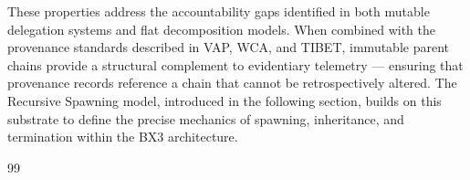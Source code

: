 These properties address the accountability gaps identified in both mutable delegation systems and flat decomposition models. When combined with the provenance standards described in VAP, WCA, and TIBET, immutable parent chains provide a structural complement to evidentiary telemetry — ensuring that provenance records reference a chain that cannot be retrospectively altered. The Recursive Spawning model, introduced in the following section, builds on this substrate to define the precise mechanics of spawning, inheritance, and termination within the BX3 architecture.


\begin{thebibliography}{99}
\end{thebibliography}